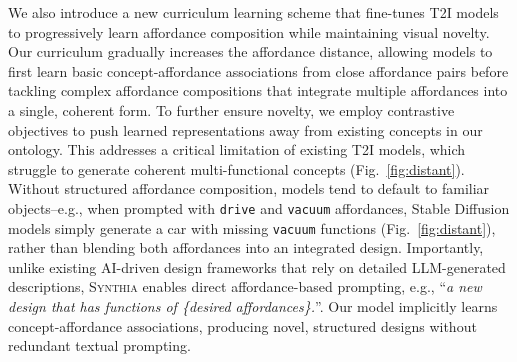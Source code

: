 
We also introduce a new curriculum learning scheme that fine-tunes T2I models to progressively learn affordance composition while maintaining visual novelty. Our curriculum gradually increases the affordance distance, allowing models to first learn basic concept-affordance associations from close affordance pairs before tackling complex affordance compositions that integrate multiple affordances into a single, coherent form. To further ensure novelty, we employ contrastive objectives to push learned representations away from existing concepts in our ontology. This addresses a critical limitation of existing T2I models, which struggle to generate coherent multi-functional concepts (Fig.~\ref{fig:distant}). Without structured affordance composition, models tend to default to familiar objects--e.g., when prompted with \texttt{drive} and \texttt{vacuum} affordances, Stable Diffusion models simply generate a car with missing \texttt{vacuum} functions (Fig.~\ref{fig:distant}), rather than blending both affordances into an integrated design. Importantly, unlike existing AI-driven design frameworks that rely on detailed LLM-generated descriptions, \textsc{Synthia} enables direct affordance-based prompting, e.g., ``\textit{a new design that has functions of \{desired affordances\}.}''. Our model implicitly learns concept-affordance associations, producing novel, structured designs without redundant textual prompting. 

